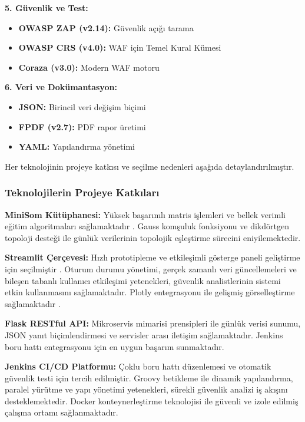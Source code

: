 \textbf{5. Güvenlik ve Test:}
\begin{itemize}
    \item \textbf{OWASP ZAP (v2.14):} Güvenlik açığı tarama
    \item \textbf{OWASP CRS (v4.0):} WAF için Temel Kural Kümesi
    \item \textbf{Coraza (v3.0):} Modern WAF motoru
\end{itemize}

\newpage

\textbf{6. Veri ve Dokümantasyon:}
\begin{itemize}
    \item \textbf{JSON:} Birincil veri değişim biçimi
    \item \textbf{FPDF (v2.7):} PDF rapor üretimi
    \item \textbf{YAML:} Yapılandırma yönetimi
\end{itemize}

Her teknolojinin projeye katkısı ve seçilme nedenleri aşağıda detaylandırılmıştır.

\subsubsection{Teknolojilerin Projeye Katkıları}

\textbf{MiniSom Kütüphanesi:} Yüksek başarımlı matris işlemleri ve bellek verimli eğitim algoritmaları sağlamaktadır \cite{minisom2017}. Gauss komşuluk fonksiyonu ve dikdörtgen topoloji desteği ile günlük verilerinin topolojik eşleştirme sürecini eniyilemektedir.

\textbf{Streamlit Çerçevesi:} Hızlı prototipleme ve etkileşimli gösterge paneli geliştirme için seçilmiştir \cite{streamlit2023,ozturk2022streamlit}. Oturum durumu yönetimi, gerçek zamanlı veri güncellemeleri ve bileşen tabanlı kullanıcı etkileşimi yetenekleri, güvenlik analistlerinin sistemi etkin kullanmasını sağlamaktadır. Plotly entegrasyonu ile gelişmiş görselleştirme sağlamaktadır \cite{plotly2015}.

\textbf{Flask RESTful API:} Mikroservis mimarisi prensipleri ile günlük verisi sunumu, JSON yanıt biçimlendirmesi ve servisler arası iletişim sağlamaktadır. Jenkins boru hattı entegrasyonu için en uygun başarım sunmaktadır.

\textbf{Jenkins CI/CD Platformu:} Çoklu boru hattı düzenlemesi ve otomatik güvenlik testi için tercih edilmiştir. Groovy betikleme ile dinamik yapılandırma, paralel yürütme ve yapı yönetimi yetenekleri, sürekli güvenlik analizi iş akışını desteklemektedir. Docker konteynerleştirme teknolojisi \cite{kaplan2021docker_guvenlik} ile güvenli ve izole edilmiş çalışma ortamı sağlanmaktadır.


